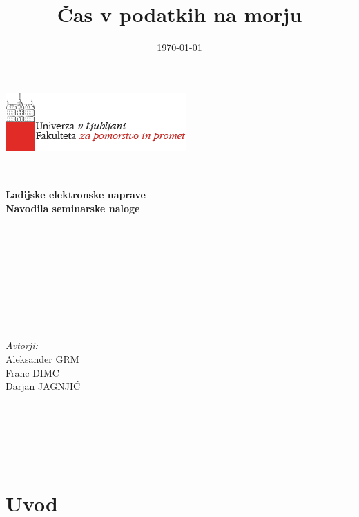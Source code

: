 \documentclass[11pt,a4]{article}
\title{Čas v podatkih na morju}
\date{\today}
\author{}
\makeatletter
\let\thetitle\@title
\let\thedate\@date
\makeatother
\begin{document}

\begin{titlepage}
	\centering
	\vspace*{-2cm}
    \includegraphics[scale = 0.75]{logo_FPP.png}\\[1.0 cm]
    
	\rule{\linewidth}{1 mm} \\[0.4 cm]
	{ \huge \bfseries Ladijske elektronske naprave} \\[0.5 cm]
	{ \Large \bfseries Navodila seminarske naloge}
	\rule{\linewidth}{1 mm} \\[1 cm]
	
	\rule{\linewidth}{0.5 mm} \\[0.4 cm]
	{ \large \bfseries \thetitle}\\[0.0 cm]
	\rule{\linewidth}{0.5 mm} \\[2 cm]
	
	\begin{minipage}{0.4\textwidth}
		\begin{flushleft} \large
			\emph{Avtorji:}\\[0.2 cm]
			Aleksander GRM\\
			Franc DIMC\\
			Darjan JAGNJIĆ
			\end{flushleft}
			\end{minipage}~
			\begin{minipage}{0.4\textwidth}
			\begin{flushright}
			\end{flushright}
	\end{minipage}\\[2 cm]
	
	\vfill
	
	{\large \thedate}\\[2 cm]
 
	
	
\end{titlepage}


\tableofcontents
\pagebreak


\section{Uvod}


\newpage


\end{document}
